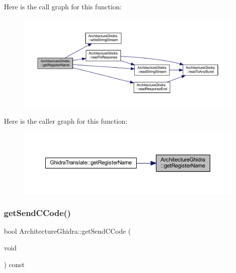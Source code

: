 Here is the call graph for this function\+:
\nopagebreak
\begin{figure}[H]
\begin{center}
\leavevmode
\includegraphics[width=350pt]{class_architecture_ghidra_a37f48166235bff1cf154a989aa22bfde_cgraph}
\end{center}
\end{figure}
Here is the caller graph for this function\+:
\nopagebreak
\begin{figure}[H]
\begin{center}
\leavevmode
\includegraphics[width=350pt]{class_architecture_ghidra_a37f48166235bff1cf154a989aa22bfde_icgraph}
\end{center}
\end{figure}
\mbox{\label{class_architecture_ghidra_af958cd760e93ccb0cbf61e650f684a95}} 
\subsubsection{\texorpdfstring{getSendCCode()}{getSendCCode()}}
{\footnotesize\ttfamily bool Architecture\+Ghidra\+::get\+Send\+C\+Code (\begin{DoxyParamCaption}\item[{void}]{ }\end{DoxyParamCaption}) const\hspace{0.3cm}{\ttfamily [inline]}}



